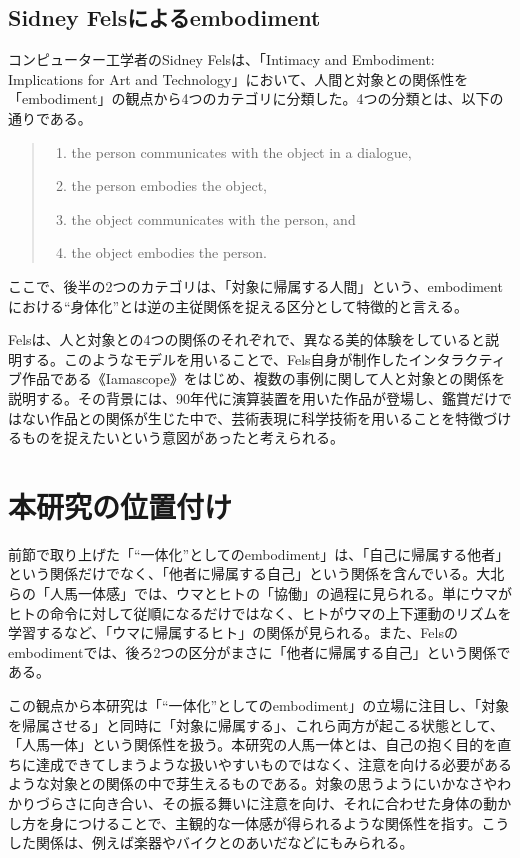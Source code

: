 \subsection{Sidney Felsによるembodiment}
\label{Fels_model}
コンピューター工学者のSidney Felsは、「Intimacy and Embodiment: Implications for Art and Technology」\cite{Fels}において、人間と対象との関係性を「embodiment」の観点から4つのカテゴリに分類した。4つの分類とは、以下の通りである。

\begin{quote}
  \begin{enumerate}
    \item the person communicates with the object in a dialogue,
    \item the person embodies the object,
    \item the object communicates with the person, and
    \item the object embodies the person.
  \end{enumerate}
\end{quote}

ここで、後半の2つのカテゴリは、「対象に帰属する人間」という、embodimentにおける``身体化''とは逆の主従関係を捉える区分として特徴的と言える。

Felsは、人と対象との4つの関係のそれぞれで、異なる美的体験をしていると説明する。このようなモデルを用いることで、Fels自身が制作したインタラクティブ作品である《Iamascope》をはじめ、複数の事例に関して人と対象との関係を説明する。その背景には、90年代に演算装置を用いた作品が登場し、鑑賞だけではない作品との関係が生じた中で、芸術表現に科学技術を用いることを特徴づけるものを捉えたいという意図があったと考えられる。

\section{本研究の位置付け}
前節で取り上げた「``一体化''としてのembodiment」は、「自己に帰属する他者」という関係だけでなく、「他者に帰属する自己」という関係を含んでいる。大北らの「人馬一体感」では、ウマとヒトの「協働」の過程に見られる。単にウマがヒトの命令に対して従順になるだけではなく、ヒトがウマの上下運動のリズムを学習するなど、「ウマに帰属するヒト」の関係が見られる。また、Felsのembodimentでは、後ろ2つの区分がまさに「他者に帰属する自己」という関係である。

この観点から本研究は「``一体化''としてのembodiment」の立場に注目し、「対象を帰属させる」と同時に「対象に帰属する」、これら両方が起こる状態として、「人馬一体」という関係性を扱う。本研究の人馬一体とは、自己の抱く目的を直ちに達成できてしまうような扱いやすいものではなく、注意を向ける必要があるような対象との関係の中で芽生えるものである。対象の思うようにいかなさやわかりづらさに向き合い、その振る舞いに注意を向け、それに合わせた身体の動かし方を身につけることで、主観的な一体感が得られるような関係性を指す。こうした関係は、例えば楽器やバイクとのあいだなどにもみられる。

